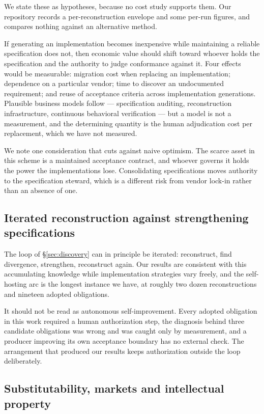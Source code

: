 \documentclass[10pt,twocolumn]{article}
\begin{document}
We state these as hypotheses, because no cost study supports them. Our
repository records a per-reconstruction envelope and some per-run
figures, and compares nothing against an alternative method.

If generating an implementation becomes inexpensive while maintaining a
reliable specification does not, then economic value should shift toward
whoever holds the specification and the authority to judge conformance
against it. Four effects would be measurable: migration cost when
replacing an implementation; dependence on a particular vendor; time to
discover an undocumented requirement; and reuse of acceptance criteria
across implementation generations. Plausible business models follow ---
specification auditing, reconstruction infrastructure, continuous
behavioral verification --- but a model is not a measurement, and the
determining quantity is the human adjudication cost per replacement,
which we have not measured.

We note one consideration that cuts against naive optimism. The scarce
asset in this scheme is a maintained acceptance contract, and whoever
governs it holds the power the implementations lose. Consolidating
specifications moves authority to the specification steward, which is a
different risk from vendor lock-in rather than an absence of one.

\subsection{Iterated reconstruction against strengthening specifications}

The loop of \S\ref{sec:discovery} can in principle be iterated:
reconstruct, find divergence, strengthen, reconstruct again. Our results
are consistent with this accumulating knowledge while implementation
strategies vary freely, and the self-hosting arc is the longest instance
we have, at roughly two dozen reconstructions and nineteen adopted
obligations.

It should not be read as autonomous self-improvement. Every adopted
obligation in this work required a human authorization step, the
diagnosis behind three candidate obligations was wrong and was caught
only by measurement, and a producer improving its own acceptance
boundary has no external check. The arrangement that produced our
results keeps authorization outside the loop deliberately.

\subsection{Substitutability, markets and intellectual property}
\end{document}
